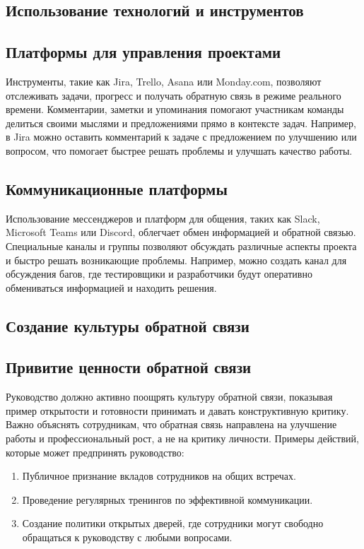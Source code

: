     \subsection{Использование технологий и инструментов}

    \subsection*{Платформы для управления проектами}
    Инструменты, такие как Jira, Trello, Asana или Monday.com, позволяют отслеживать задачи, прогресс и получать обратную связь в режиме реального времени. Комментарии, заметки и упоминания помогают участникам команды делиться своими мыслями и предложениями прямо в контексте задач. Например, в Jira можно оставить комментарий к задаче с предложением по улучшению или вопросом, что помогает быстрее решать проблемы и улучшать качество работы.

    \subsection*{Коммуникационные платформы}
    Использование мессенджеров и платформ для общения, таких как Slack, Microsoft Teams или Discord, облегчает обмен информацией и обратной связью. Специальные каналы и группы позволяют обсуждать различные аспекты проекта и быстро решать возникающие проблемы. Например, можно создать канал для обсуждения багов, где тестировщики и разработчики будут оперативно обмениваться информацией и находить решения.

    \subsection{Создание культуры обратной связи}

    \subsection*{Привитие ценности обратной связи}
    Руководство должно активно поощрять культуру обратной связи, показывая пример открытости и готовности принимать и давать конструктивную критику. Важно объяснять сотрудникам, что обратная связь направлена на улучшение работы и профессиональный рост, а не на критику личности. Примеры действий, которые может предпринять руководство:
    
    \begin{enumerate}
        \item Публичное признание вкладов сотрудников на общих встречах.
        \item Проведение регулярных тренингов по эффективной коммуникации.
        \item Создание политики открытых дверей, где сотрудники могут свободно обращаться к руководству с любыми вопросами.
    \end{enumerate}
    
